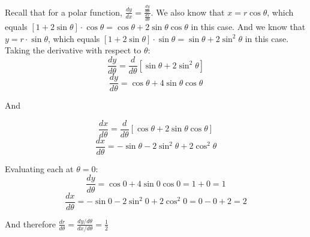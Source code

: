 \begin{Answer}[ref = polar1]
Recall that for a polar function, $\frac{dy}{dx} = \frac{\frac{dy}{d\theta}}{
\frac{dx}{d\theta}}$. We also know that $x = r \cos{\theta}$, which equals 
$\left[ 1 + 2\sin{\theta} \right] \cdot \cos{\theta} = \cos{\theta} + 2\sin{
\theta}\cos{\theta}$ in this case. And we know that $y = r \cdot \sin{\theta}$, 
which equals $\left[ 1 + 2 \sin{\theta} \right] \cdot \sin{\theta} = \sin{
\theta} + 2 \sin^2{\theta}$ in this case. Taking the derivative with respect 
to $\theta$:
$$\frac{dy}{d\theta} = \frac{d}{d\theta} \left[ \sin{\theta} + 2 \sin^2{\theta} 
\right]$$
$$\frac{dy}{d\theta} = \cos{\theta} + 4\sin{\theta}\cos{\theta}$$

And

$$\frac{dx}{d\theta} = \frac{d}{d\theta} \left[ \cos{\theta} + 2\sin{\theta}\cos{
\theta} \right]$$
$$\frac{dx}{d\theta} = -\sin{\theta} - 2\sin^2{\theta} + 2\cos^2{\theta}$$

Evaluating each at $\theta = 0$:
$$\frac{dy}{d\theta} = \cos{0} + 4\sin{0}\cos{0} = 1 + 0 = 1$$
$$\frac{dx}{d\theta} = -\sin{0} - 2\sin^2{0} + 2\cos^2{0} = 0 - 0 + 2 = 2$$

And therefore $\frac{dr}{d\theta} = \frac{dy/d\theta}{dx/d\theta} = \frac{1}{2}$
\end{Answer}

